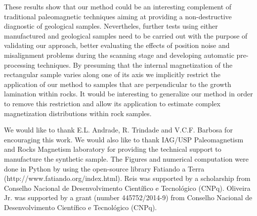 \documentclass[draft,gc]{agutex}
\begin{document}
\begin{article}
These results show that our method could be an interesting complement
of traditional paleomagnetic techniques aiming at providing a 
non-destructive diagnostic of geological samples.
Nevertheles, further tests using either manufactured and geological samples 
need to be carried out with the purpose of validating our approach,
better evaluating the effects of position noise 
and misalignment problems during the scanning stage and
developing automatic pre-processing techniques.
By presuming that the internal magnetization of the rectangular 
sample varies along one of its axis we implicitly restrict the
application of our method to samples that are perpendicular
to the growth lamination within rocks.
It would be interesting to generalize our method in order to
remove this restriction and allow its application to estimate
complex magnetization distributions within rock samples.


%
%
%
%
%
%
%

\begin{acknowledgments}
We would like to thank E.L. Andrade, R. Trindade and V.C.F. Barbosa
for encouraging this work. We would also like to thank
IAG/USP Paleomagnetism and Rocks Magnetism laboratory for providing the
technical support to manufacture the synthetic sample.
The Figures and numerical computation were done in Python
by using the open-source library Fatiando a Terra 
(http://www.fatiando.org/index.html).
Reis was supported by a scholarship from Conselho Nacional 
de Desenvolvimento Cient\'{i}fico e Tecnol\'{o}gico (CNPq). 
Oliveira Jr. was supported by a grant (number 445752/2014-9)
from Conselho Nacional 
de Desenvolvimento Cient\'{i}fico e Tecnol\'{o}gico (CNPq).
\end{acknowledgments}


\end{article}
\end{document}
